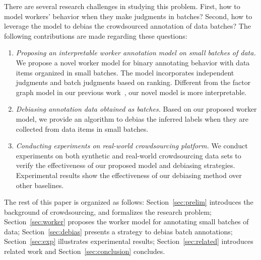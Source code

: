 There are several research challenges in studying this problem.  
First, how to model workers' behavior when they make judgments in batches?  
Second, how to leverage the model to debias the crowdsourced annotation of data batches?
The following contributions are made regarding these questions:
\begin{enumerate}
  \item \emph{Proposing an interpretable worker annotation model on small batches of data.}
        We propose a novel worker model for binary annotating behavior with data items organized in small batches.  
        The model incorporates independent judgments and batch judgments based on ranking.  
        Different from the factor graph model in our previous work~\cite{zhuang:wsdm2015}, 
        our novel model is more interpretable.  
  \item \emph{Debiasing annotation data obtained as batches.}
        Based on our proposed worker model, we provide an algorithm to debias the inferred labels 
        when they are collected from data items in small batches.  
  \item \emph{Conducting experiments on real-world crowdsourcing platform.}  
        We conduct experiments on both synthetic and real-world crowdsourcing data sets 
        to verify the effectiveness of our proposed model and debiasing strategies.  
        Experimental results show the effectiveness of our debiasing method over other baselines.   
\end{enumerate}

The rest of this paper is organized as follows:
Section~\ref{sec:prelim} introduces the background of crowdsourcing, and formalizes the research problem;
Section~\ref{sec:worker} proposes the worker model for annotating small batches of data;
Section~\ref{sec:debias} presents a strategy to debias batch annotations;
Section~\ref{sec:exp} illustrates experimental results;
Section~\ref{sec:related} introduces related work and Section~\ref{sec:conclusion} concludes. 






